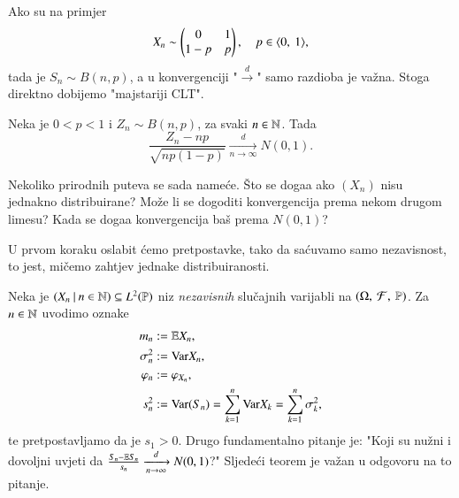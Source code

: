 Ako su na primjer
\begin{equation*}
    X_n \sim
    \begin{pmatrix}
        0 & 1\\
        1 - p & p
    \end{pmatrix},
    \quad p \in \langle {0}, \: {1} \rangle,
\end{equation*}
tada je $S_n \sim B (n, p)$, a u konvergenciji "$\xrightarrow{d}$" samo razdioba je va\v zna.
Stoga direktno dobijemo "majstariji CLT".

\begin{kor}  \label{kor:19.2}
    Neka je $0 < p < 1$ i $Z_n \sim B (n, p)$, za svaki $n \in \mathbb{N}$.
    Tada
    \begin{equation*}
        \frac{Z_n - n p}{\sqrt{n p (1 - p)}} \xrightarrow[n \to \infty]{d} N (0, 1).
    \end{equation*}
\end{kor}

\begin{nap} \label{nap:19.3}
    Nekoliko prirodnih puteva se sada name\' ce.
    \v Sto se doga\dj a ako $(X_n)$ nisu jednakno distribuirane?
    Mo\v ze li se dogoditi konvergencija prema nekom drugom limesu?
    Kada se doga\dj a konvergencija ba\v s prema $N(0, 1)$?
\end{nap}

U prvom koraku oslabit \' cemo pretpostavke, tako da sa\' cuvamo samo nezavisnost, to jest, mi\v cemo zahtjev jednake distribuiranosti.

Neka je $({X_n} \: | \: {n \in \mathbb{N}}) \subseteq L^2 (\mathbb{P})$ niz \emph{nezavisnih} slu\v cajnih varijabli na $(\Omega, \: \mathcal{F}, \: \mathbb{P})$.
Za $n \in \mathbb{N}$ uvodimo oznake
\begin{equation*}
    \begin{aligned}
        m_n &:= \mathbb{E} X_n,\\
        \sigma^2_n &:= \mathrm{Var} X_n,\\
        \varphi_n &:= \varphi_{X_n},\\
        s^2_n &:= \mathrm{Var} (S_n) = \sum\limits_{k = 1}^{n} \mathrm{Var} X_k = \sum\limits_{k = 1}^{n} \sigma^2_k,
    \end{aligned}
\end{equation*}
te pretpostavljamo da je $s_1 > 0$.
Drugo fundamentalno pitanje je: "Koji su nu\v zni i dovoljni uvjeti
da $\frac{S_n - \mathbb{E} S_n}{s_n} \xrightarrow[n \to \infty]{d} N(0, 1)$?"
Sljede\' ci teorem je va\v zan u odgovoru na to pitanje.

